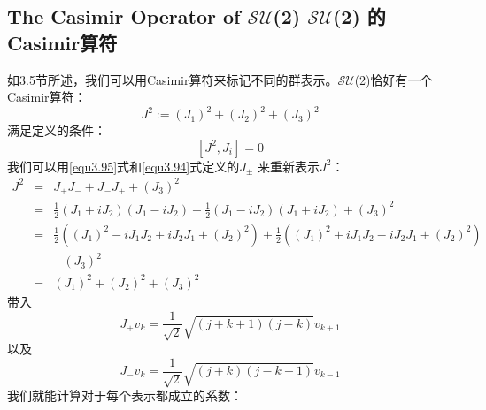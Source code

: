\subsection[$\mathcal{SU}$(2)的 Casimir算符]{The Casimir Operator of $\mathcal{SU}$(2)  $\mathcal{SU}$(2) 的 Casimir算符}
\label{sec3.6.2}
如3.5节所述，我们可以用Casimir算符来标记不同的群表示。$\mathcal{SU}$(2)恰好有一个Casimir算符：
\begin{equation}\label{equ3.107}
  J^2:=(J_1)^2+(J_2)^2+(J_3)^2
\end{equation}
满足定义的条件：
\begin{equation}\label{equ3.108}
  [J^2,J_i]=0
\end{equation}
我们可以用\ref{equ3.95}式和\ref{equ3.94}式定义的$J_\pm$ 来重新表示$J^2$：
\begin{eqnarray}
\nonumber  J^2 &=&J_+J_- + J_-J_+ +(J_3)^2\\
\nonumber      &=& \frac{1}{2}(J_1+iJ_2)(J_1-iJ_2)+\frac{1}{2}(J_1-iJ_2)(J_1+iJ_2)+(J_3)^2   \\
\nonumber      &=& \frac{1}{2}((J_1)^2-iJ_1J_2+iJ_2J_1+(J_2)^2)+\frac{1}{2}((J_1)^2+iJ_1J_2-iJ_2J_1+(J_2)^2)\\
\nonumber      &&+(J_3)^2 \\
\label{equ3.109}
               &=& (J_1)^2+(J_2)^2+(J_3)^2
\end{eqnarray}
带入
\begin{equation}\label{equ3.110}
  J_+v_k=\frac{1}{\sqrt{2}}\sqrt{(j+k+1)(j-k)} v_{k+1}
\end{equation}
以及
\begin{equation}\label{equ3.111}
  J_-v_k=\frac{1}{\sqrt{2}}\sqrt{(j+k)(j-k+1)} v_{k-1}
\end{equation}
我们就能计算对于每个表示都成立的系数：
